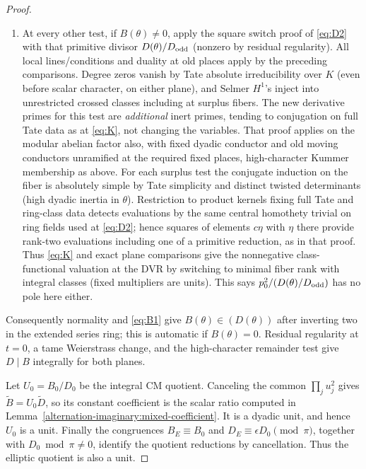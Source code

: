 \begin{proof}
\begin{enumerate}[label=\textup{(\roman*)}]
\item At every other test, if \(B(\theta)\ne0\), apply the square switch proof of \eqref{eq:D2} with that primitive divisor \(D(\theta)/D_{\rm odd}\) (nonzero by residual regularity). All local lines/conditions and duality at old places apply by the preceding comparisons. Degree zeros vanish by Tate absolute irreducibility over \(K\) (even before scalar character, on either plane), and Selmer \(H^1\)'s inject into unrestricted crossed classes including at surplus fibers. The new derivative primes for this test are \emph{additional} inert primes, tending to conjugation on full Tate data as at \eqref{eq:K}, not changing the variables. That proof applies on the modular abelian factor also, with fixed dyadic conductor and old moving conductors unramified at the required fixed places, high-character Kummer membership as above. For each surplus test the conjugate induction on the fiber is absolutely simple by Tate simplicity and distinct twisted determinants (high dyadic inertia in \(\theta\)). Restriction to product kernels fixing full Tate and ring-class data detects evaluations by the same central homothety trivial on ring fields used at \eqref{eq:D2}; hence squares of elements \(c\eta\) with \(\eta\) there provide rank-two evaluations including one of a primitive reduction, as in that proof. Thus \eqref{eq:K} and exact plane comparisons give the nonnegative class-functional valuation at the DVR by switching to minimal fiber rank with integral classes (fixed multipliers are units). This says \(p_0^2/(D(\theta)/D_{\rm odd})\) has no pole here either.

\end{enumerate}

Consequently normality and \eqref{eq:B1} give
\(B(\theta)\in(D(\theta))\) after inverting two in the extended
series ring; this is automatic if \(B(\theta)=0\). Residual regularity
at \(t=0\), a tame Weierstrass change, and the high-character remainder
test give \(D\mid B\) integrally for both planes.

Let \(U_0=B_0/D_0\) be the integral CM quotient. Canceling the common
\(\prod_j u_j^2\) gives \(\widetilde B=U_0\widetilde D\), so its
constant coefficient is the scalar ratio computed in
Lemma~\ref{alternation-imaginary:mixed-coefficient}. It is a dyadic unit,
and hence \(U_0\) is a unit. Finally the congruences
\(B_E\equiv B_0\) and \(D_E\equiv\epsilon D_0\pmod\pi\), together
with \(D_0\bmod\pi\ne0\), identify the quotient reductions by
cancellation. Thus the elliptic quotient is also a unit.
\end{proof}

